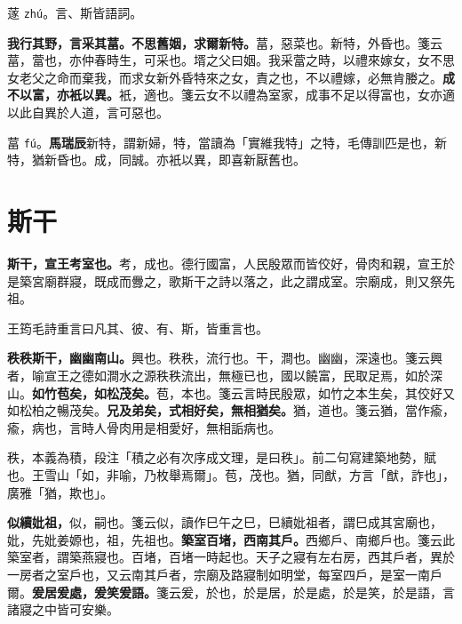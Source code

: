 \begin{quoting}蓫 \texttt{zhú}。言、斯皆語詞。\end{quoting}

\textbf{我行其野，言采其葍。不思舊姻，求爾新特。}{\footnotesize 葍，惡菜也。新特，外昏也。箋云葍，䔰也，亦仲春時生，可采也。壻之父曰姻。我采䔰之時，以禮來嫁女，女不思女老父之命而棄我，而求女新外昏特來之女，責之也，不以禮嫁，必無肯媵之。}\textbf{成不以富，亦衹以異。}{\footnotesize 衹，適也。箋云女不以禮為室家，成事不足以得富也，女亦適以此自異於人道，言可惡也。}

\begin{quoting}葍 \texttt{fú}。\textbf{馬瑞辰}新特，謂新婦，特，當讀為「實維我特」之特，毛傳訓匹是也，新特，猶新昏也。成，同誠。亦衹以異，即喜新厭舊也。\end{quoting}

\section{斯干}


\textbf{斯干，宣王考室也。}{\footnotesize 考，成也。德行國富，人民殷眾而皆佼好，骨肉和親，宣王於是築宮廟群寢，既成而釁之，歌斯干之詩以落之，此之謂成室。宗廟成，則又祭先祖。}

\begin{quoting}王筠毛詩重言曰凡其、彼、有、斯，皆重言也。\end{quoting}

\textbf{秩秩斯干，幽幽南山。}{\footnotesize 興也。秩秩，流行也。干，澗也。幽幽，深遠也。箋云興者，喻宣王之德如澗水之源秩秩流出，無極已也，國以饒富，民取足焉，如於深山。}\textbf{如竹苞矣，如松茂矣。}{\footnotesize 苞，本也。箋云言時民殷眾，如竹之本生矣，其佼好又如松柏之暢茂矣。}\textbf{兄及弟矣，式相好矣，無相猶矣。}{\footnotesize 猶，道也。箋云猶，當作瘉，瘉，病也，言時人骨肉用是相愛好，無相詬病也。}

\begin{quoting}秩，本義為積，段注「積之必有次序成文理，是曰秩」。前二句寫建築地勢，賦也。王雪山「如，非喻，乃枚舉焉爾」。苞，茂也。猶，同猷，方言「猷，詐也」，廣雅「猶，欺也」。\end{quoting}

\textbf{似續妣祖，}{\footnotesize 似，嗣也。箋云似，讀作巳午之巳，巳續妣祖者，謂巳成其宮廟也，妣，先妣姜嫄也，祖，先祖也。}\textbf{築室百堵，西南其戶。}{\footnotesize 西鄉戶、南鄉戶也。箋云此築室者，謂築燕寢也。百堵，百堵一時起也。天子之寢有左右房，西其戶者，異於一房者之室戶也，又云南其戶者，宗廟及路寢制如明堂，每室四戶，是室一南戶爾。}\textbf{爰居爰處，爰笑爰語。}{\footnotesize 箋云爰，於也，於是居，於是處，於是笑，於是語，言諸寢之中皆可安樂。}

